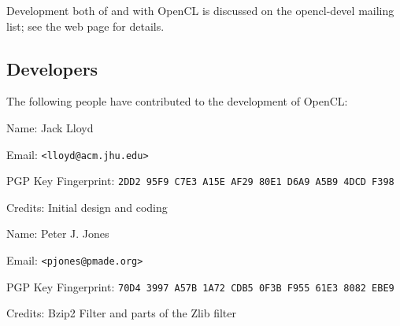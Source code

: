 \documentclass{article}
\begin{document}
\vskip 5pt \noindent
Development both of and with OpenCL is discussed on the opencl-devel mailing
list; see the web page for details.

\subsection{Developers}

The following people have contributed to the development of OpenCL:

\newcommand{\developer}[4]{
\noindent \vskip 5pt
Name: #1

Email: \texttt{<#2>}

PGP Key Fingerprint: \texttt{#3}

Credits: #4

\vskip 3pt
}

\developer{Jack Lloyd}{lloyd@acm.jhu.edu}
{2DD2 95F9 C7E3 A15E AF29 80E1 D6A9 A5B9 4DCD F398}
{Initial design and coding}

\developer{Peter J. Jones}{pjones@pmade.org}
{70D4 3997 A57B 1A72 CDB5 0F3B F955 61E3 8082 EBE9}
{Bzip2 Filter and parts of the Zlib filter}
\end{document}
